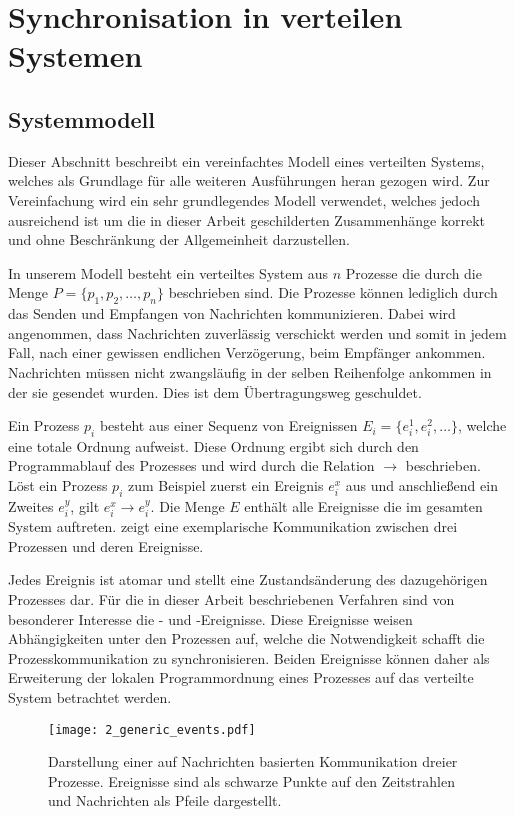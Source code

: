 \section{Synchronisation in verteilen Systemen}
\label{cap:Uhrenarten}
\subsection{Systemmodell}
Dieser Abschnitt beschreibt ein vereinfachtes Modell eines verteilten Systems, welches als Grundlage für alle weiteren Ausführungen heran gezogen wird.
Zur Vereinfachung wird ein sehr grundlegendes Modell verwendet, welches jedoch ausreichend ist um die in dieser Arbeit geschilderten Zusammenhänge korrekt und ohne Beschränkung der Allgemeinheit darzustellen.

In unserem Modell besteht ein verteiltes System aus $n$ Prozesse die durch die Menge $P=\{p_1, p_2,\ldots, p_n\}$ beschrieben sind.
Die Prozesse können lediglich durch das Senden und Empfangen von Nachrichten kommunizieren.
Dabei wird angenommen, dass Nachrichten zuverlässig verschickt werden und somit in jedem Fall, nach einer gewissen endlichen Verzögerung, beim Empfänger ankommen.
Nachrichten müssen nicht zwangsläufig in der selben Reihenfolge ankommen in der sie gesendet wurden.
Dies ist dem Übertragungsweg geschuldet.

Ein Prozess $p_i$ besteht aus einer Sequenz von Ereignissen $E_i=\{e_i^1, e_i^2, \ldots\}$, welche eine totale Ordnung aufweist.
Diese Ordnung ergibt sich durch den Programmablauf des Prozesses und wird durch die Relation $\rightarrow$ beschrieben.
Löst ein Prozess $p_i$ zum Beispiel zuerst ein Ereignis $e_i^x$ aus und anschließend ein Zweites $e_i^y$, gilt $e_i^x \rightarrow e_i^y$. 
Die Menge $E$ enthält alle Ereignisse die im gesamten System auftreten.
 zeigt eine exemplarische Kommunikation zwischen drei Prozessen und deren Ereignisse.

Jedes Ereignis ist atomar und stellt eine Zustandsänderung des dazugehörigen Prozesses dar.
Für die in dieser Arbeit beschriebenen Verfahren sind von besonderer Interesse die - und -Ereignisse.
Diese Ereignisse weisen Abhängigkeiten unter den Prozessen auf, welche die Notwendigkeit schafft die Prozesskommunikation zu synchronisieren.
Beiden Ereignisse können daher als Erweiterung der lokalen Programmordnung eines Prozesses auf das verteilte System betrachtet werden.

\begin{figure}[ht]
    \centering
    \texttt{[image: 2\_generic\_events.pdf]}
    \caption[Beispiel einer beliebigen Kommunikation]{Darstellung einer auf Nachrichten basierten Kommunikation dreier Prozesse. Ereignisse sind als schwarze Punkte auf den Zeitstrahlen und Nachrichten als Pfeile dargestellt.}
    \label{fig:genericEvents}
\end{figure}

